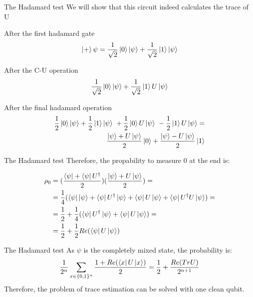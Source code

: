 \documentclass[leqno,fleqn]{beamer}
\begin{document}
\begin{frame}[label=sec-1-7]{The Hadamard test}
We will show that this circuit indeed calculates the trace of U
\begin{block}{After the first hadamard gate}
\begin{align*}
   \Ket{+}\psi = \frac{1}{\sqrt{2}}\Ket{0}\Ket{\psi} + \frac{1}{\sqrt{2}}\Ket{1}\Ket{\psi}
\end{align*}
\end{block}
\begin{block}{After the C-U operation}
\begin{align*}
   \frac{1}{\sqrt{2}}\Ket{0}\Ket{\psi} + \frac{1}{\sqrt{2}}\Ket{1}U\Ket{\psi}
\end{align*}
\end{block}
\begin{block}{After the final hadamard operation}
\begin{align*}
   \frac{1}{2}\Ket{0}\Ket{\psi} + \frac{1}{2}\Ket{1}\Ket{\psi}\ +\frac{1}{2}\Ket{0}U\Ket{\psi}\ -  \frac{1}{2}\Ket{1}U\Ket{\psi} = \\
   \frac{\Ket{\psi} + U\Ket{\psi}}{2}\Ket{0} + \frac{\Ket{\psi} - U\Ket{\psi}}{2}\Ket{1}
\end{align*}
\end{block}
\end{frame}

\begin{frame}[label=sec-1-8]{The Hadamard test}
Therefore, the propability to measure 0 at the end is:

\begin{align*}
\rho_{0} &= (\frac{\left\langle{\psi}\right\vert + \left\langle{\psi}\right\vert U^\dagger}{2})(\frac{\left\vert{\psi}\right\rangle + U\left\vert{\psi}\right\rangle}{2}) = \\
    &= \frac{1}{4}(\left\langle{\psi}\right\vert\left\vert{\psi}\right\rangle + \left\langle{\psi}\right\vert U^\dagger\left\vert{\psi}\right\rangle + \left\langle{\psi}\right\vert U\left\vert{\psi}\right\rangle + \left\langle{\psi}\right\vert U^\dagger U\left\vert{\psi}\right\rangle) = \\
    &= \frac{1}{2} + \frac{1}{4}(\left\langle{\psi}\right\vert U^\dagger\left\vert{\psi}\right\rangle + \left\langle{\psi}\right\vert U\left\vert{\psi}\right\rangle) = \\
    &=  \frac{1}{2} + \frac{1}{2}Re(\left\langle{\psi}\right\vert U\left\vert{\psi}\right\rangle)
\end{align*}
\end{frame}
\begin{frame}[label=sec-1-9]{The Hadamard test}
As \(\psi\) is the completely mixed state, the probability is: \\
\begin{align*}
  \frac{1}{2^{n}}\sum_{x \in \{0,1\}^n}{\frac{1+Re(\left\langle{x}\right\vert U\left\vert{x}\right\rangle)}{2}} = \frac{1}{2} + \frac{Re(TrU)}{2^{n+1}}
\end{align*}
Therefore, the problem of trace estimation can be solved with one clean qubit.
\end{frame}
\end{document}
